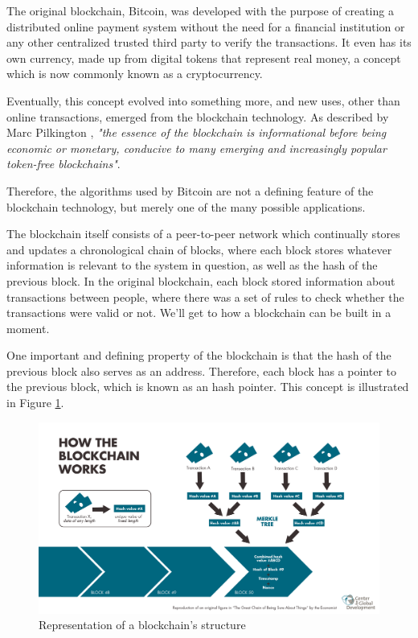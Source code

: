 The original blockchain, Bitcoin, was developed with the purpose of creating a distributed online payment system without the need for a financial institution or any other centralized trusted third party to verify the transactions. It even has its own currency, made up from digital tokens that represent real money, a concept which is now commonly known as a cryptocurrency.

Eventually, this concept evolved into something more, and new uses, other than online transactions, emerged from the blockchain technology. As described by Marc Pilkington \cite{Pilkington2015}, \textit{"the essence of the blockchain is informational before being economic or monetary, conducive to many emerging and increasingly popular token-free blockchains"}.

Therefore, the algorithms used by Bitcoin are not a defining feature of the blockchain technology, but merely one of the many possible applications.
    
    The blockchain itself consists of a peer-to-peer network which continually stores and updates a chronological chain of blocks, where each block stores whatever information is relevant to the system in question, as well as the hash of the previous block. In the original blockchain, each block stored information about transactions between people, where there was a set of rules to check whether the transactions were valid or not. We'll get to how a blockchain can be built in a moment.
    
    One important and defining property of the blockchain is that the hash of the previous block also serves as an address. Therefore, each block has a pointer to the previous block, which is known as an hash pointer. This concept is illustrated in Figure \ref{fig:blockchain_workflow}.
    
\begin{figure}[h]
\centering
\includegraphics[scale=0.35]{media/Blockchain_workflow.png}
\caption{Representation of a blockchain's structure}
\label{fig:blockchain_workflow}
\end{figure}

